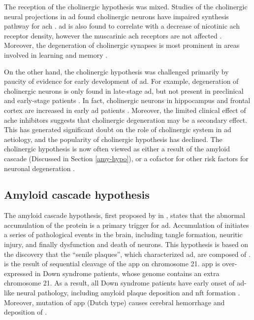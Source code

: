 The reception of the cholinergic hypothesis was mixed. Studies of the cholinergic neural projections in \gls{ad} found cholinergic neurons have impaired synthesis pathway for \gls{ach} \citep{milner87}. \gls{ad} is also found to correlate with a decrease of nicotinic \gls{ach} receptor density, however the muscarinic \gls{ach} receptors are not affected \citep{nordberg92, burghaus00}. Moreover, the degeneration of cholinergic synapses is most prominent in areas involved in learning and memory \citep{geula96}. 

On the other hand, the cholinergic hypothesis was challenged primarily by paucity of evidence for early development of \gls{ad}. For example, degeneration of cholinergic neurons is only found in late-stage \gls{ad}, but not present in preclinical and early-stage patients \citep{davis99}. In fact, cholinergic neurons in hippocampus and frontal cortex are increased in early \gls{ad} patients \citep{dekosky02}. Moreover, the limited clinical effect of \gls{ache} inhibitors suggests that cholinergic degeneration may be a secondary effect. This has generated significant doubt on the role of cholinergic system in \gls{ad} aetiology, and the popularity of cholinergic hypothesis has declined. The cholinergic hypothesis is now often viewed as either a result of the amyloid cascade (Discussed in Section \ref{amy-hypo}), or a cofactor for other risk factors for neuronal degeneration \citep{roberson97, contestabile11}.

\subsection{Amyloid cascade hypothesis\label{amy-hypo}}
The amyloid cascade hypothesis, first proposed by \citeauthor{hardy92} in \citeyear{hardy92}, states that the abnormal accumulation of the protein \abeta{} is a primary trigger for \gls{ad}. Accumulation of \abeta{} initiates a series of pathological events in the brain, including tangle formation, neuritic injury, and finally dysfunction and death of neurons. This hypothesis is based on the discovery that the ``senile plaques'', which characterized \gls{ad}, are composed of \abeta{} \citep{masters85}. \abeta{} is the result of sequential cleavage of the \gls{app}  on chromosome 21. \Gls{app} is over-expressed in Down syndrome patients, whose genome contains an extra chromosome 21. As a result, all Down syndrome patients have early onset of \gls{ad}-like neural pathology, including amyloid plaque deposition and \gls{nft} formation \citep{wisniewski85, hardy02}. Moreover, mutation of \gls{app} (Dutch type) causes cerebral hemorrhage and deposition of \abeta{} \citep{hardy02}.

